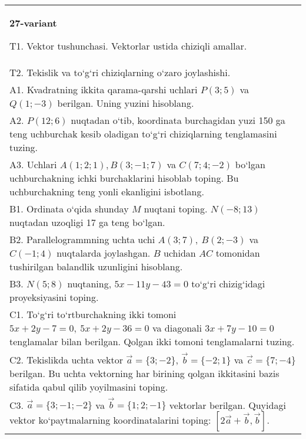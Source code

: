 \documentclass{article}
\begin{document}
\begin{tabular}{m{17cm}}
\textbf{27-variant}

T1. 
Vektor tushunchasi. Vektorlar ustida chiziqli amallar.
 \\
T2. 
Tekislik va to‘g‘ri chiziqlarning o‘zaro joylashishi.
 \\
A1. 
Kvadratning ikkita qarama-qarshi uchlari $P (3; 5) $ va
$Q (1; -3) $ berilgan. Uning yuzini hisoblang.
 \\
A2. 
$P (12;6)$ nuqtadan o‘tib, koordinata burchagidan
yuzi 150 ga teng uchburchak kesib oladigan to‘g‘ri chiziqlarning
tenglamasini tuzing.
 \\
A3. 
Uchlari $A (1;2;1), B (3;-1;7) $ va $C (7;4;-2) $ bo‘lgan uchburchakning
ichki burchaklarini hisoblab toping. Bu uchburchakning teng yonli ekanligini isbotlang.
 \\
B1. 
Ordinata o‘qida shunday $M$ nuqtani toping.
\(N (-8;13) \) nuqtadan uzoqligi 17 ga teng bo‘lgan.
 \\
B2. 
Parallelogrammning uchta uchi \(A (3;7),\ B (2;-3) \) va
\(C (-1;4) \) nuqtalarda joylashgan. $B$ uchidan $AC$
tomonidan tushirilgan balandlik uzunligini hisoblang.
 \\
B3. 
\(N (5;8) \) nuqtaning, \(5x-11y-43=0\) to‘g‘ri chizig‘idagi
proyeksiyasini toping.
 \\
C1. 
To‘g‘ri to‘rtburchakning ikki tomoni
\(5x+2y-7=0,\ 5x+2y-36=0\) va diagonali
\(3x+7y-10=0\) tenglamalar bilan berilgan. Qolgan ikki tomoni
tenglamalarni tuzing.
 \\
C2. 
Tekislikda uchta vektor $\vec{a} = \{ 3; - 2\}$, $\vec{b} = \{ - 2;1\}$ va $\vec{c} = \{ 7; - 4\}$ berilgan. Bu uchta vektorning har birining qolgan ikkitasini bazis sifatida qabul qilib yoyilmasini toping.
 \\
C3. 
$\vec{a} = \{ 3; - 1; - 2\}$ va $\vec{b} = \{ 1;2; - 1\}$ vektorlar berilgan. Quyidagi vektor ko‘paytmalarning koordinatalarini toping:
$\left\lbrack 2\vec{a} + \vec{b},\vec{b} \right\rbrack$.
 \\

\end{tabular}
\vspace{1cm}
\end{document}
